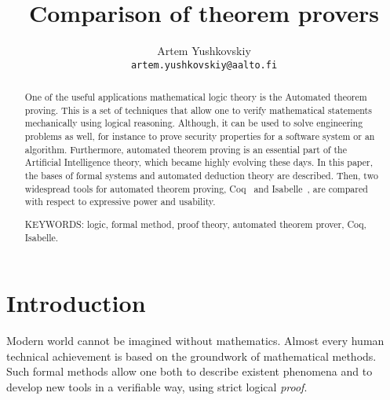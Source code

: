 \documentclass[article]{aaltoseries}
\begin{document}

\title{Comparison of theorem provers}

\author{Artem Yushkovskiy
\\\textnormal{\texttt{artem.yushkovskiy@aalto.fi}}}


\maketitle


\begin{abstract}
One of the useful applications mathematical logic theory is the Automated theorem proving. This is a set of techniques that allow one to verify mathematical statements mechanically using logical reasoning. Although, it can be used to solve engineering problems as well, for instance to prove security properties for a software system or an algorithm. Furthermore, automated theorem proving is an essential part of the Artificial Intelligence theory, which became highly evolving these days. In this paper, the bases of formal systems and automated deduction theory are described. Then, two widespread tools for automated theorem proving, Coq~\cite{tool_Coq} and Isabelle~\cite{tool_Isabelle}, are compared with respect to expressive power and usability.

\vspace{3mm}
\noindent KEYWORDS: logic, formal method, proof theory, automated theorem prover, Coq, Isabelle.
	
\end{abstract}



\section{Introduction}

Modern world cannot be imagined without mathematics. Almost every human technical achievement is based on the groundwork of mathematical methods. Such formal methods allow one both to describe existent phenomena and to develop new tools in a verifiable way, using strict logical \textit{proof}.

\end{document}
